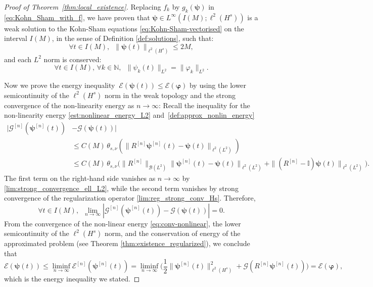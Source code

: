 \documentclass[12pt,a4paper]{amsart}
\numberwithin{equation}{section}
\newcommand{\ulpsi}{\boldsymbol{\psi}}
\newcommand{\ulphi}{\boldsymbol{\varphi}}
\newcommand{\thetasnu}{\theta_{s,\nu}}
\begin{document}
\begin{proof}[Proof of Theorem~\ref{thm:local_existence}]
		Replacing $f_k$ by $g_k(\ulpsi)$ in \eqref{eq:Kohn_Sham_with_f}, we have proven that $ \ulpsi \in L^\infty(I(M); \ell^2(H^{s}) )$ is a weak solution to the Kohn-Sham equations \eqref{eq:Kohn-Sham-vectorised} on the interval $ I(M) $, in the sense of Definition \ref{def:solutions}, such that:
		\begin{equation}\label{eq:unif-bound-l2Hs}
			\forall t \in I(M), \;\ \| \ulpsi(t) \|_{ \ell^2(H^{s})} \leq 2M,
		\end{equation}
		and each $L^2$ norm is conserved:
		\begin{equation}
			\forall t \in I(M), \, \forall k \in \mathbb{N}, \;\ \| \psi_k(t) \|_{L^2} = \| \varphi_k \|_{L^2} . 
		\end{equation}
		
		Now we prove the energy inequality $ \ \mathcal{E}(\ulpsi(t)) \leq \mathcal{E}(\ulphi ) $ by using the lower semicontinuity of the $ \ell^2(H^{s}) $ norm in the weak topology and the strong convergence of the non-linearity energy as $n\to \infty$: Recall the inequality for the non-linearity energy \eqref{est:nonlinear_energy_L2} and~\eqref{def:approx_nonlin_energy}
		\begin{align}
			| \mathscr{G}^{[n]}(\ulpsi^{[n]}(t)) & - \mathscr{G}(\ulpsi(t)) | \\
			& \leq  C(M) \, \thetasnu (\| R^{[n]}\ulpsi^{[n]}(t) - \ulpsi(t) \|_{\ell^2(L^2)})  \\ 
			&\leq C(M)	\, \thetasnu \Big( \| R^{[n]} \|_{\mathcal{B}(L^{2})} \| \ulpsi^{[n]}(t) - \ulpsi(t) \|_{\ell^2(L^2)} + \| (R^{[n]}-\mathbb{I}) \ulpsi (t) \|_{\ell^2(L^2)} \Big) .
		\end{align}
		The first term on the right-hand side vanishes as $n\to\infty$ by \eqref{lim:strong_convergence_ell_L2}, while the second term vanishes by strong convergence of the regularization operator \eqref{lim:reg_strong_conv_Hs}. Therefore, 
		\begin{equation}\label{eq:conv-nonlinear}
			\forall t \in I(M), \;\ \lim_{n \rightarrow \infty} | \mathscr{G}^{[n]}(\ulpsi^{[n]}(t)) - \mathscr{G}(\ulpsi(t)) | = 0.
		\end{equation}
		From the convergence of the non-linear energy \eqref{eq:conv-nonlinear}, the lower semicontinuity of the $ \ell^2(H^{s}) $ norm, and the conservation of energy of the approximated problem (see Theorem \ref{thm:existence_regularized}), we conclude that
		\begin{equation}
			\mathcal{E}(\ulpsi(t)) \leq \liminf_{n \rightarrow  \infty} \mathcal{E}^{[n]}(\ulpsi^{[n]}(t)) = \liminf_{n \rightarrow  \infty} \Big( \frac{1}{2} \| \ulpsi^{[n]}(t) \|_{\ell^2(H^{s})}^2 + \mathscr{G}( R^{[n]}\ulpsi^{[n]}(t)) \Big) = \mathcal{E}(\ulphi) ,
		\end{equation}
		which is the energy inequality we stated.
		

\end{proof}
\end{document}
